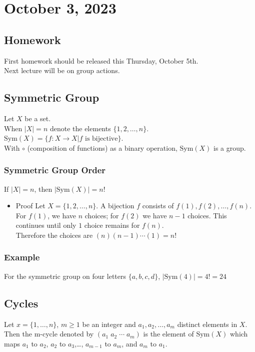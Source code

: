 \documentclass[11pt]{article}
\newcommand{\0}{\emptyset}
\begin{document}
\section*{October 3, 2023}
\label{sec:org892c7aa}
\subsection*{Homework}
\label{sec:orgd089074}
First homework should be released this Thursday, October 5th.\\[0pt]
Next lecture will be on group actions.\\[0pt]
\subsection*{Symmetric Group}
\label{sec:org33d1afc}
Let \(X\) be a set.\\[0pt]
When \(|X|=n\) denote the elements \(\{1,2,\ldots,n\}\).\\[0pt]
\(\text{Sym}(X)=\{f:X\to X|f\text{ is bijective}\}\).\\[0pt]
With \(\circ\) (composition of functions) as a binary operation, \(\text{Sym}(X)\) is a group.\\[0pt]
\subsubsection*{Symmetric Group Order}
\label{sec:orgf081046}
If \(|X|=n\), then \(|\text{Sym}(X)|=n!\)\\[0pt]
\begin{itemize}
\item Proof
\label{sec:org51f1a3e}
Let \(X=\{1,2,\ldots,n\}\). A bijection \(f\) consists of \(f(1),f(2),\ldots,f(n)\).\\[0pt]
For \(f(1)\), we have \(n\) choices; for \(f(2)\) we have \(n-1\) choices. This continues until only \(1\) choice remains for \(f(n)\).\\[0pt]
Therefore the choices are \((n)(n-1)\cdots(1)=n!\)\\[0pt]
\end{itemize}
\subsubsection*{Example}
\label{sec:orgb4f124a}
For the symmetric group on four letters \(\{a,b,c,d\}\), \(|\text{Sym}(4)|=4!=24\)\\[0pt]
\subsection*{Cycles}
\label{sec:org4fba1ea}
Let \(x=\{1,\ldots,n\}\), \(m\geq1\) be an integer and \(a_{1},a_{2},\ldots,a_{m}\) distinct elements in \(X\).\\[0pt]
Then the m-cycle denoted by \((a_{1}\;a_{2}\;\cdots\;a_{m})\) is the element of \(\text{Sym}(X)\) which maps \(a_{1}\) to \(a_{2}\), \(a_{2}\) to \(a_{3}\),\ldots{}, \(a_{m-1}\) to \(a_{m}\), and \(a_{m}\) to \(a_{1}\).\\[0pt]
\end{document}
